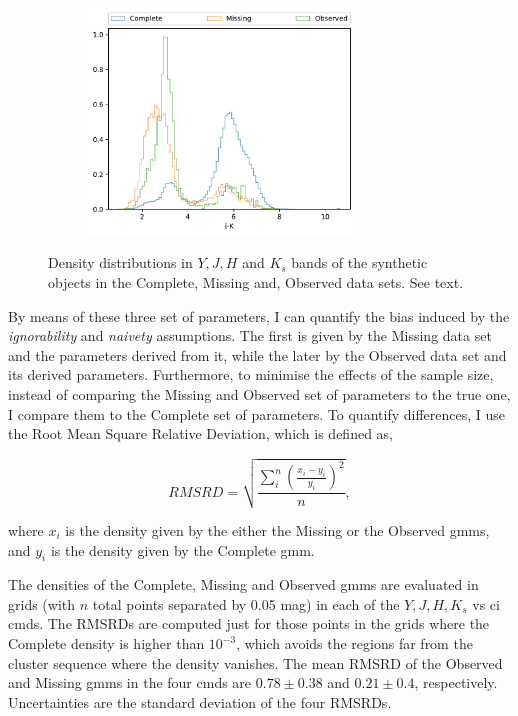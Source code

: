 \begin{figure}[ht!]
\begin{subfigure}[t]{0.45\textwidth}
      \includegraphics[page=5,height=6cm]{background/Figures/Check_distributions.pdf}
    \end{subfigure}
\caption{Density distributions in $Y,J,H$ and $K_s$ bands of the synthetic objects in the Complete, Missing and, Observed data sets. See text.}
\label{fig:ignorability_synthetic}
\end{figure}

By means of these three set of parameters, I can quantify the bias induced by the \emph{ignorability} and \emph{naivety} assumptions. The first is given by the Missing data set and the parameters derived from it, while the later by the Observed data set and its derived parameters. Furthermore, to minimise the effects of the sample size, instead of comparing the Missing and Observed set of parameters to the true one, I  compare them to the Complete set of parameters. To quantify differences, I use the Root Mean Square Relative Deviation, which is defined as, 

\begin{equation}
RMSRD = \sqrt{\frac{\sum_i^n\left(\frac{x_i-y_i}{y_i}\right)^2}{n}}, \nonumber
\end{equation}

where $x_i$ is the density given by the either the Missing or the Observed \glspl{gmm}, and $y_i$ is the density given by the Complete \gls{gmm}. 

The densities of the Complete, Missing and Observed \glspl{gmm} are evaluated in grids (with $n$ total points separated by 0.05 mag) in each of the $Y,J,H,K_s$ vs \gls{ci} \glspl{cmd}. The RMSRDs are computed just for those points in the grids where the Complete density is higher than $10^{-3}$, which avoids the regions far from the cluster sequence where the density vanishes. The mean RMSRD of the Observed  and Missing \glspl{gmm} in the four \glspl{cmd} are $0.78\pm0.38$ and $0.21\pm0.4$, respectively. Uncertainties are the standard deviation of the four RMSRDs.

